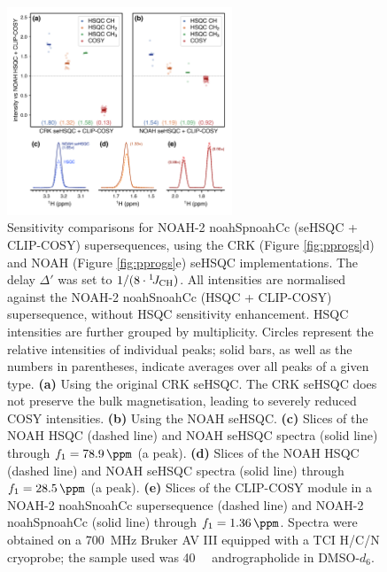 \documentclass[11pt]{article}
\newcommand*{\noahtwo}[2]{\csname noah#1\endcsname\csname noah#2\endcsname}
\newcommand*{\onejch}{{}^{1}\!J_{\ce{CH}}}
\newcommand*{\figref}[1]{Figure \ref{fig:#1}}
\newcommand*{\andro}{Spectra were obtained on a \SI{700}{\MHz} Bruker AV III equipped with a TCI H/C/N cryoprobe; the sample used was \SI{40}{\milli\molar} andrographolide in DMSO-$d_6$.}
\begin{document}
\begin{figure}
    \centering
    \includegraphics[width=0.6\textwidth]{spor_spv2_comp.png}
    \caption{
        Sensitivity comparisons for NOAH-2 \noahtwo{Sp}{Cc} (seHSQC + CLIP-COSY) supersequences, using the CRK (\figref{pprogs}d) and NOAH (\figref{pprogs}e) seHSQC implementations.
        The delay $\Delta'$ was set to $1/(8\cdot\onejch)$.
        All intensities are normalised against the NOAH-2 \noahtwo{S}{Cc} (HSQC + CLIP-COSY) supersequence, without HSQC sensitivity enhancement.
        HSQC intensities are further grouped by multiplicity.
        Circles represent the relative intensities of individual peaks; solid bars, as well as the numbers in parentheses, indicate averages over all peaks of a given type.
        \textbf{(a)} Using the original CRK seHSQC.
        The CRK seHSQC does not preserve the bulk magnetisation, leading to severely reduced COSY intensities.
        \textbf{(b)} Using the NOAH seHSQC.
        \textbf{(c)} Slices of the NOAH HSQC (dashed line) and NOAH seHSQC spectra (solid line) through $f_1 = \SI{78.9}{\ppm}$ (a  peak).
        \textbf{(d)} Slices of the NOAH HSQC (dashed line) and NOAH seHSQC spectra (solid line) through $f_1 = \SI{28.5}{\ppm}$ (a  peak).
        \textbf{(e)} Slices of the CLIP-COSY module in a NOAH-2 \noahtwo{S}{Cc} supersequence (dashed line) and NOAH-2 \noahtwo{Sp}{Cc} (solid line) through $f_1 = \SI{1.36}{\ppm}$.
        \andro{}
    }
    \label{fig:spor_spv2}
\end{figure}
\end{document}

